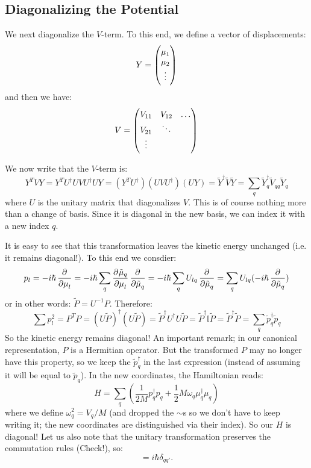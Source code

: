 \subsection{Diagonalizing the Potential}

We next diagonalize the $V$-term. To this end, we define a vector of displacements:
\begin{align*}
    Y = \begin{pmatrix}\mu_1 \\ \mu_2 \\ \vdots \\\end{pmatrix}
\end{align*}
and then we have:
\begin{align*}
    V = \begin{pmatrix}V_{11} & V_{12} & \ldots
    \\ V_{21} & \ddots & 
    \\ \vdots & &\end{pmatrix}
\end{align*}

We now write that the $V$-term is:
\begin{equation}
    Y^T V Y = Y^T U^\dag U V U^\dag U Y = (Y^T U^\dag) (U V U^\dag) (U Y) = \tilde{Y}^\dag \tilde{V} \tilde{Y} = \sum_q \tilde{Y}_q^\dag \tilde{V}_{qq}\tilde{Y}_q
\end{equation}
where $U$ is the unitary matrix that diagonalizes $V$. This is of course nothing more than a change of basis. Since it is diagonal in the new basis, we can index it with a new index $q$.

It is easy to see that this transformation leaves the kinetic energy unchanged (i.e. it remains diagonal!). To this end we consdier:
\begin{equation}
    p_l = -i\hbar\dpd{}{\mu_l} = -i\hbar \sum_q \dpd{\tilde{\mu}_q}{\mu_l}\dpd{}{\tilde{\mu}_q} = -i\hbar \sum_q U_{lq}\dpd{}{\tilde{\mu}_q} = \sum_q U_{lq} (-i\hbar\dpd{}{\tilde{\mu}_q})
\end{equation}
or in other words: $\tilde{P} = U^{-1}P$. Therefore:
\begin{equation}
    \sum p_l^2 = P^TP = (U\tilde{P})^\dag(U\tilde{P}) = \tilde{P}^\dag U^\dag U \tilde{P} = \tilde{P}^\dag \mathbb{I} \tilde{P} = \tilde{P}^\dag \tilde{P} = \sum_q \tilde{p}_q^\dag \tilde{p}_q
\end{equation}
So the kinetic energy remains diagonal! An important remark; in our canonical representation, $P$ is a Hermitian operator. But the transformed $P$ may no longer have this property, so we keep the $\tilde{p}_q^\dag$ in the last expression (instead of assuming it will be equal to $\tilde{p}_q$). In the new coordinates, the Hamiltonian reads:
\begin{equation}\label{eq-diagonalizedlatticeH}
    H = \sum_q \left(\frac{1}{2M}p^\dag_q p_q + \frac{1}{2}M\omega_q\mu^\dag_q \mu_q\right)
\end{equation}
where we define $\omega_q^2 = V_q/M$ (and dropped the $\sim$s so we don't have to keep writing it; the new coordinates are distinguished via their index). So our $H$ is diagonal! Let us also note that the unitary transformation preserves the commutation rules (Check!), so:
\begin{equation}
    [\mu_q, p_{q'}] = i\hbar\delta_{qq'}.
\end{equation}

